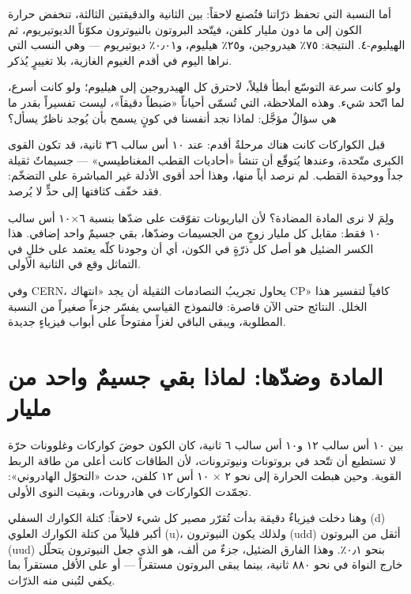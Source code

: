 \documentclass[12pt,a4paper,openany]{book}
\begin{document}
أما النسبة التي تحفظ ذرّاتنا فتُصنع لاحقاً: بين الثانية والدقيقتين الثالثة، تنخفض حرارة الكون إلى ما دون مليار كلفن، فيتّحد البروتون بالنيوترون مكوّناً الديوتيريوم، ثم الهيليوم-٤. النتيجة: ٧٥٪ هيدروجين، و٢٥٪ هيليوم، و٠٫٠١٪ ديوتيريوم — وهي النسب التي نراها اليوم في أقدم الغيوم الغازية، بلا تغييرٍ يُذكر.


ولو كانت سرعة التوسّع أبطأ قليلاً، لاحترق كل الهيدروجين إلى هيليوم؛ ولو كانت أسرع، لما اتّحد شيء. وهذه الملاحظة، التي تُسمّى أحياناً «ضبطاً دقيقاً»، ليست تفسيراً بقدر ما هي سؤالٌ مؤجَّل: لماذا نجد أنفسنا في كونٍ يسمح بأن يُوجد ناظرٌ يسأل؟


قبل الكواركات كانت هناك مرحلةٌ أقدم: عند ١٠ أس سالب ٣٦ ثانية، قد تكون القوى الكبرى متّحدة، وعندها يُتوقّع أن تنشأ «أحاديات القطب المغناطيسي» — جسيماتٌ ثقيلة جداً ووحيدة القطب. لم نرصد أياً منها، وهذا أحد أقوى الأدلة غير المباشرة على التضخّم: فقد خفّف كثافتها إلى حدٍّ لا يُرصد.


ولِمَ لا نرى المادة المضادة؟ لأن الباريونات تفوّقت على ضدّها بنسبة ٦×١٠ أس سالب ١٠ فقط: مقابل كل مليار زوجٍ من الجسيمات وضدّها، بقي جسيمٌ واحد إضافي. هذا الكسر الضئيل هو أصل كل ذرّةٍ في الكون، أي أن وجودنا كلّه يعتمد على خللٍ في التماثل وقع في الثانية الأولى.


وفي CERN، يحاول تجريبُ التصادمات الثقيلة أن يجد «انتهاك CP» كافياً لتفسير هذا الخلل. النتائج حتى الآن قاصرة: فالنموذج القياسي يفسّر جزءاً صغيراً من النسبة المطلوبة، ويبقى الباقي لغزاً مفتوحاً على أبواب فيزياءٍ جديدة.


\chapter*{المادة وضدّها: لماذا بقي جسيمٌ واحد من مليار}




بين ١٠ أس سالب ١٢ و١٠ أس سالب ٦ ثانية، كان الكون حوضَ كواركات وغلوونات حرّة لا تستطيع أن تتّحد في بروتونات ونيوترونات، لأن الطاقات كانت أعلى من طاقة الربط القوية. وحين هبطت الحرارة إلى نحو ٢ × ١٠ أس ١٢ كلفن، حدث «التحوّل الهادروني»: تجمّدت الكواركات في هادرونات، وبقيت النوى الأولى.


وهنا دخلت فيزياءٌ دقيقة بدأت تُقرّر مصير كل شيء لاحقاً: كتلة الكوارك السفلي (d) أكبر قليلاً من كتلة الكوارك العلوي (u)، ولذلك يكون النيوترون (udd) أثقل من البروتون (uud) بنحو ٠٫١٪. وهذا الفارق الضئيل، جزءٌ من ألف، هو الذي جعل النيوترون يتحلّل خارج النواة في نحو ٨٨٠ ثانية، بينما يبقى البروتون مستقراً — أو على الأقل مستقراً بما يكفي لتُبنى منه الذرّات.
\end{document}
